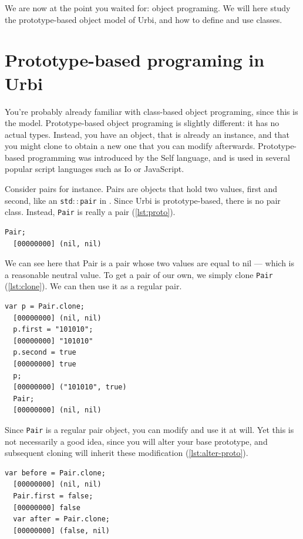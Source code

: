 \documentclass[openright,twoside,12pt]{report}
\newcommand{\io}{Io\xspace}
\newcommand{\js}{JavaScript\xspace}
\newcommand{\urbi}{Urbi\xspace}
\newcommand{\lst}[1]{\autoref{lst:#1}}
\begin{document}
We are now at the point you waited for: object programing. We will
here study the prototype-based object model of \urbi, and how to
define and use classes.

\section{Prototype-based programing in \urbi}

You're probably already familiar with class-based object programing,
since this is the \Cxx model. Prototype-based object programing is
slightly different: it has no actual types. Instead, you have an
object, that is already an instance, and that you might clone to
obtain a new one that you can modify afterwards. Prototype-based
programming was introduced by the Self language, and is used in
several popular script languages such as \io or \js.

Consider pairs for instance. Pairs are objects that hold two values,
first and second, like an \texttt{std$::$pair} in \Cxx. Since \urbi is
prototype-based, there is no pair class. Instead, \lstinline|Pair| is
really a pair (\lst{proto}).

\begin{lstlisting}[caption=Prototypes in \urbi, label=lst:proto]
  Pair;
  [00000000] (nil, nil)
\end{lstlisting}

We can see here that Pair is a pair whose two values are equal to nil
--- which is a reasonable neutral value. To get a pair of our own, we
simply clone \lstinline|Pair| (\lst{clone}). We can then use it as a
regular pair.

\begin{lstlisting}[caption=Cloning, label=lst:clone]
  var p = Pair.clone;
  [00000000] (nil, nil)
  p.first = "101010";
  [00000000] "101010"
  p.second = true
  [00000000] true
  p;
  [00000000] ("101010", true)
  Pair;
  [00000000] (nil, nil)
\end{lstlisting}

Since \lstinline|Pair| is a regular pair object, you can modify and
use it at will. Yet this is not necessarily a good idea, since you
will alter your base prototype, and subsequent cloning will inherit
these modification (\lst{alter-proto}).

\begin{lstlisting}[caption=Altering a prototype, label=lst:alter-proto]
  var before = Pair.clone;
  [00000000] (nil, nil)
  Pair.first = false;
  [00000000] false
  var after = Pair.clone;
  [00000000] (false, nil)
\end{lstlisting}
\end{document}
